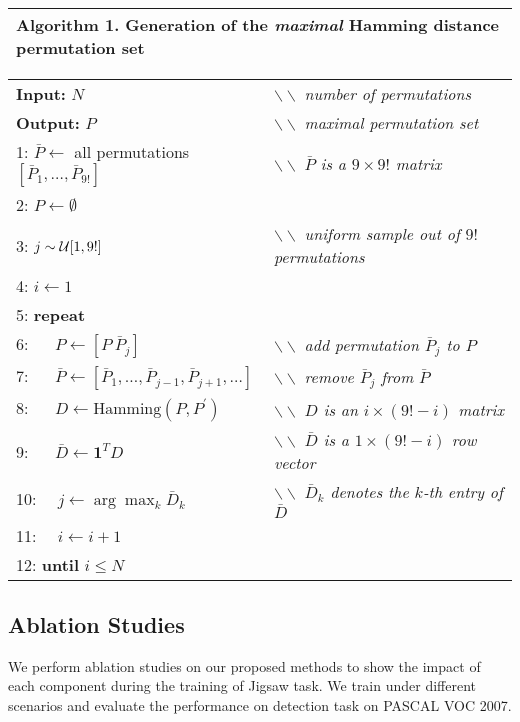 \documentclass[runningheads]{llncs}
\begin{document}
\begin{table}[t!]
\label{algo:haming}
\begin{tabular}{ l@{\hspace{3em}}}
\Xhline{2\arrayrulewidth}
  \textbf{Algorithm 1.} Generation of the \textit{maximal} Hamming distance permutation set\\
 \hline 
\end{tabular} 
\begin{tabular}{ l@{\hspace{2em}} l}
\textbf{Input:} $N$    &$\backslash\backslash$ \emph{number of permutations} \\
 \textbf{Output:} $P$ &$\backslash\backslash$ \emph{maximal permutation set} \\
 1: $\bar P \leftarrow$ all permutations $[\bar P_1,\dots,\bar P_{9!}]$&$\backslash\backslash$ \emph{$\bar P$ is a $9 \times 9!$ matrix}\\
 2: $P \leftarrow \emptyset$ \\
 3: $j \sim {\cal U}[1,9!]$& \hfill$\backslash\backslash$ \emph{uniform sample out of $9!$ permutations} \\
 4: $i \leftarrow 1$&\\
 5: \textbf{repeat} &\\
 6: $\quad$ $P \leftarrow [P~ \bar P_j]$ & $\backslash\backslash$ \emph{add permutation $\bar P_j$ to $P$} \\
 7: $\quad$ $\bar P \leftarrow  [\bar P_1,\dots,\bar P_{j-1}, \bar P_{j+1}, \dots]$ & $\backslash\backslash$ \emph{remove $\bar P_j$ from $\bar P$} \\
 8: $\quad$ $D \leftarrow \text{Hamming}(P,P^{\prime})$ & $\backslash\backslash$ \emph{$D$ is an $i \times (9!-i)$ matrix}\\
 9: $\quad$ $\bar D \leftarrow \mathbf{1}^T D$ &$\backslash\backslash$ \emph{$\bar D$ is a $1 \times (9!-i)$ row vector}\\
10:$\quad$ $j \leftarrow \arg \max_{k} \bar D_k$ &$\backslash\backslash$ \emph{$\bar D_k$ denotes the $k$-th entry of $\bar D$}\\
11:$\quad$ $i \leftarrow i+1$ &\\
12: \textbf{until} $i \leq N$ &\\
\hline
\end{tabular}
\end{table}

\subsection{Ablation Studies}
We perform ablation studies on our proposed methods to show the impact of each component during the training of Jigsaw task. We train under different scenarios and evaluate the performance on detection task on PASCAL VOC 2007.  
\end{document}
